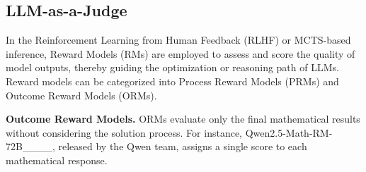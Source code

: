 


\subsection{LLM-as-a-Judge}
In the Reinforcement Learning from Human Feedback (RLHF) or MCTS-based inference, Reward Models (RMs) are employed to assess and score the quality of model outputs, thereby guiding the optimization or reasoning path of LLMs. Reward models can be categorized into Process Reward Models (PRMs) and Outcome Reward Models (ORMs).

\textbf{Outcome Reward Models.} ORMs evaluate only the final mathematical results without considering the solution process. For instance, Qwen2.5-Math-RM-72B____, released by the Qwen team, assigns a single score to each mathematical response.

